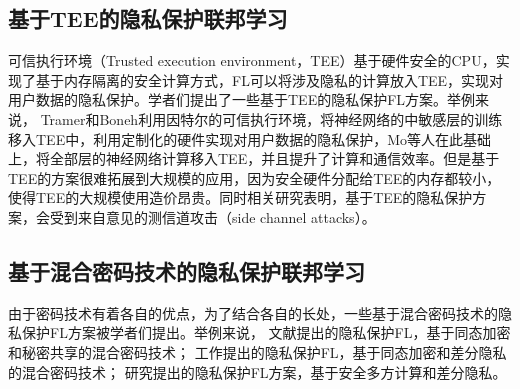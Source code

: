 \subsection{基于TEE的隐私保护联邦学习}
可信执行环境（Trusted execution environment，TEE）基于硬件安全的CPU，实现了基于内存隔离的安全计算方式，FL可以将涉及隐私的计算放入TEE，实现对用户数据的隐私保护。学者们提出了一些基于TEE的隐私保护FL方案\cite{tramer2018slalom, mo2019efficient, mo2021ppfl, mo2020darknetz}。举例来说，
Tramer和Boneh\cite{tramer2018slalom}利用因特尔的可信执行环境，将神经网络的中敏感层的训练移入TEE中，利用定制化的硬件实现对用户数据的隐私保护，Mo等人\cite{mo2021ppfl}在此基础上，将全部层的神经网络计算移入TEE，并且提升了计算和通信效率。但是基于TEE的方案很难拓展到大规模的应用，因为安全硬件分配给TEE的内存都较小，使得TEE的大规模使用造价昂贵。同时相关研究\cite{van2018foreshadow}表明，基于TEE的隐私保护方案，会受到来自意见的测信道攻击（side channel attacks）。

\subsection{基于混合密码技术的隐私保护联邦学习}
由于密码技术有着各自的优点，为了结合各自的长处，一些基于混合密码技术的隐私保护FL方案\cite{choquette2021capc, hao2019efficient, hao2019towards, mugunthan2019smpai, truex2019hybrid, xu2019verifynet, xu2019hybridalpha, zhang2020privacy, zhao2020smss}被学者们提出。举例来说，
文献\cite{xu2019verifynet, zhao2020smss}提出的隐私保护FL，基于同态加密和秘密共享的混合密码技术；
工作\cite{hao2019efficient, hao2019towards}提出的隐私保护FL，基于同态加密和差分隐私的混合密码技术；
研究\cite{mugunthan2019smpai, truex2019hybrid, xu2019hybridalpha}提出的隐私保护FL方案，基于安全多方计算和差分隐私。

